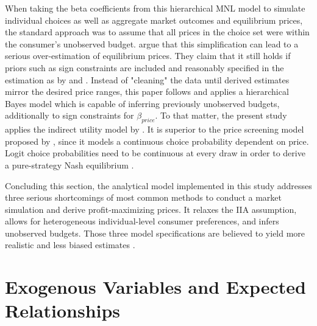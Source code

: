 \documentclass[12pt,a4paper]{article}
\begin{document}
When taking the beta coefficients from this hierarchical MNL model to simulate individual choices as well as aggregate market outcomes and equilibrium prices,
the standard approach was to assume that all prices in the choice set were within the consumer's unobserved budget.
\cite{pachaliPerilsIgnoringBudget2017} argue that this simplification can lead to a serious over-estimation of equilibrium prices.
They claim that it still holds if priors such as sign constraints are included and reasonably specified in the estimation as by \cite{sonnierHeterogeneityDistributionsWillingnesstopay2007} and \cite{allenbyEconomicValuationProduct2014}.
Instead of "cleaning" the data until derived estimates mirror the desired price ranges, this paper follows \cite{pachaliPerilsIgnoringBudget2017}
and applies a hierarchical Bayes model which is capable of inferring previously unobserved budgets, additionally to sign constraints for $\beta_{price}$.
To that matter, the present study applies the indirect utility model by \cite{berryAutomobilePricesMarket1995}.
It is superior to the price screening model proposed by \cite{gilbrideChoiceModelConjunctive2004},
since it models a continuous choice probability dependent on price.
Logit choice probabilities need to be continuous at every draw in order to derive a pure-strategy Nash equilibrium \citep{morrowFixedPointApproachesComputing2011a, pachaliPerilsIgnoringBudget2017}.

Concluding this section, the analytical model implemented in this study addresses three serious shortcomings of most common methods to conduct a market simulation and derive profit-maximizing prices.
It relaxes the IIA assumption, allows for heterogeneous individual-level consumer preferences, and infers unobserved budgets.
Those three model specifications are believed to yield more realistic and less biased estimates \citep{chandukalaChoiceModelsMarketing2008, pachaliPerilsIgnoringBudget2017}.


\section{Exogenous Variables and Expected Relationships} \label{sec_vars_relat}
\end{document}
